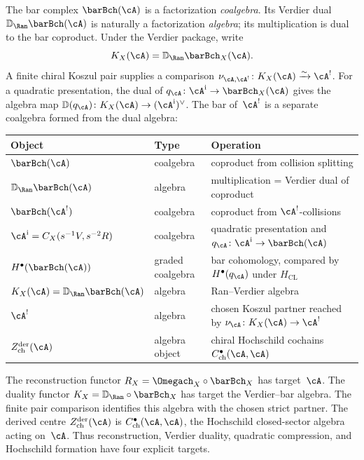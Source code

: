 \begin{remark}
\label{rem:four-objects}
The bar complex $\barBch(\cA)$ is a factorization \emph{coalgebra}.
Its Verdier dual $\mathbb{D}_{\Ran}\barBch(\cA)$ is naturally a
factorization \emph{algebra}; its multiplication is dual to the bar
coproduct.  Under the Verdier package, write
\[
 K_X(\cA)=\mathbb D_{\Ran}\barBch_X(\cA).
\]
A finite chiral Koszul pair supplies a comparison
$\nu_{\cA,\cA^!}\colon K_X(\cA)\xrightarrow{\sim}\cA^!$.
For a quadratic presentation, the dual of
$q_\cA\colon\cA^{\mathrm i}\to\barBch_X(\cA)$ gives the algebra map
$\mathbb D(q_\cA)\colon K_X(\cA)\to(\cA^{\mathrm i})^\vee$.
The bar of~$\cA^!$ is a separate coalgebra formed from the dual
algebra:
\begin{center}
\renewcommand{\arraystretch}{1.2}
\begin{tabular}{lll}
\textbf{Object} & \textbf{Type} & \textbf{Operation} \\
\hline
$\barBch(\cA)$ & coalgebra & coproduct from collision splitting \\
$\mathbb{D}_{\Ran}\barBch(\cA)$ & algebra
 & multiplication = Verdier dual of coproduct \\
$\barBch(\cA^!)$ & coalgebra & coproduct from $\cA^!$-collisions \\
$\cA^{\mathrm i}=C_X(s^{-1}V,s^{-2}R)$ & coalgebra
 & quadratic presentation and $q_\cA\colon\cA^{\mathrm i}\to\barBch(\cA)$ \\
$H^\bullet(\barBch(\cA))$ & graded coalgebra
 & bar cohomology, compared by $H^\bullet(q_\cA)$ under $H_{\mathrm{CL}}$ \\
$K_X(\cA)=\mathbb D_{\Ran}\barBch(\cA)$ & algebra
 & Ran--Verdier algebra \\
$\cA^!$ & algebra
 & chosen Koszul partner reached by $\nu_\cA\colon K_X(\cA)\to\cA^!$
 \\
$Z^{\mathrm{der}}_{\mathrm{ch}}(\cA)$ & algebra object
 & chiral Hochschild cochains $C^\bullet_{\mathrm{ch}}(\cA,\cA)$
\end{tabular}
\end{center}
The reconstruction functor $R_X = \Omegach_X \circ \barBch_X$
has target~$\cA$.  The duality functor
$K_X=\mathbb D_{\Ran}\circ\barBch_X$ has target the
Verdier--bar algebra.  The finite pair comparison identifies this
algebra with the chosen strict partner.  The derived centre
$Z^{\mathrm{der}}_{\mathrm{ch}}(\cA)$ is
$C^\bullet_{\mathrm{ch}}(\cA,\cA)$, the Hochschild closed-sector
algebra acting on~$\cA$.  Thus reconstruction, Verdier duality,
quadratic compression, and Hochschild formation have four explicit
targets.
\end{remark}

